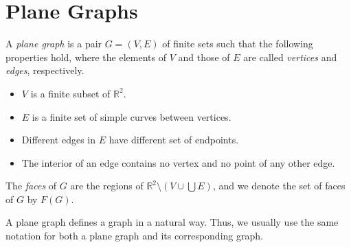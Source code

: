 \section{Plane Graphs}
\begin{definition}
  A \emph{plane graph} is a pair $G = (V, E)$ of finite sets such that the
  following properties hold, where the elements of $V$ and those of $E$ are
  called \emph{vertices} and \emph{edges}, respectively.
  \begin{itemize}
    \item $V$ is a finite subset of $\mathbb{R}^2$.
    \item $E$ is a finite set of simple curves between vertices.
    \item Different edges in $E$ have different set of endpoints.
    \item The interior of an edge contains no vertex and no point of any other
    edge.
  \end{itemize}
  The \emph{faces} of $G$ are the regions of $\mathbb{R}^2 \setminus (V \cup
  \bigcup E)$, and we denote the set of faces of $G$ by $F(G)$.
\end{definition}
\begin{remark}
  A plane graph defines a graph in a natural way.
  Thus, we usually use the same notation for both a plane graph and its
  corresponding graph.
\end{remark}